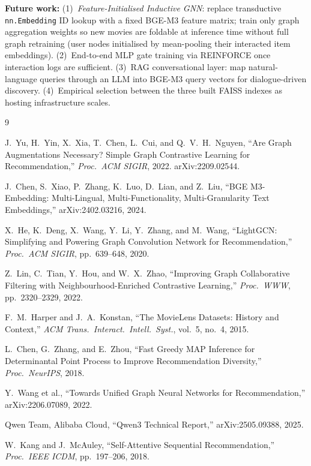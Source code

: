 \documentclass[conference]{IEEEtran}
\begin{document}
\textbf{Future work:}
(1)~\emph{Feature-Initialised Inductive GNN}: replace transductive
\texttt{nn.Embedding} ID lookup with a fixed BGE-M3 feature matrix;
train only graph aggregation weights so new movies are foldable at
inference time without full graph retraining (user nodes initialised
by mean-pooling their interacted item embeddings).
(2)~End-to-end MLP gate training via REINFORCE once interaction logs
are sufficient.
(3)~RAG conversational layer: map natural-language queries through an
LLM into BGE-M3 query vectors for dialogue-driven discovery.
(4)~Empirical selection between the three built FAISS indexes as
hosting infrastructure scales.

\begin{thebibliography}{9}

J.~Yu, H.~Yin, X.~Xia, T.~Chen, L.~Cui, and Q.~V.~H.~Nguyen,
``Are Graph Augmentations Necessary? Simple Graph Contrastive
Learning for Recommendation,''
\textit{Proc.\ ACM SIGIR}, 2022. arXiv:2209.02544.

J.~Chen, S.~Xiao, P.~Zhang, K.~Luo, D.~Lian, and Z.~Liu,
``BGE M3-Embedding: Multi-Lingual, Multi-Functionality,
Multi-Granularity Text Embeddings,''
arXiv:2402.03216, 2024.

X.~He, K.~Deng, X.~Wang, Y.~Li, Y.~Zhang, and M.~Wang,
``LightGCN: Simplifying and Powering Graph Convolution
Network for Recommendation,''
\textit{Proc.\ ACM SIGIR}, pp.\ 639--648, 2020.

Z.~Lin, C.~Tian, Y.~Hou, and W.~X.~Zhao,
``Improving Graph Collaborative Filtering with
Neighbourhood-Enriched Contrastive Learning,''
\textit{Proc.\ WWW}, pp.\ 2320--2329, 2022.

F.~M.~Harper and J.~A.~Konstan,
``The MovieLens Datasets: History and Context,''
\textit{ACM Trans.\ Interact.\ Intell.\ Syst.}, vol.~5, no.~4, 2015.

L.~Chen, G.~Zhang, and E.~Zhou,
``Fast Greedy MAP Inference for Determinantal Point Process
to Improve Recommendation Diversity,''
\textit{Proc.\ NeurIPS}, 2018.

Y.~Wang et al.,
``Towards Unified Graph Neural Networks for Recommendation,''
arXiv:2206.07089, 2022.

Qwen Team, Alibaba Cloud,
``Qwen3 Technical Report,''
arXiv:2505.09388, 2025.

W.~Kang and J.~McAuley,
``Self-Attentive Sequential Recommendation,''
\textit{Proc.\ IEEE ICDM}, pp.\ 197--206, 2018.


\end{thebibliography}
\end{document}
